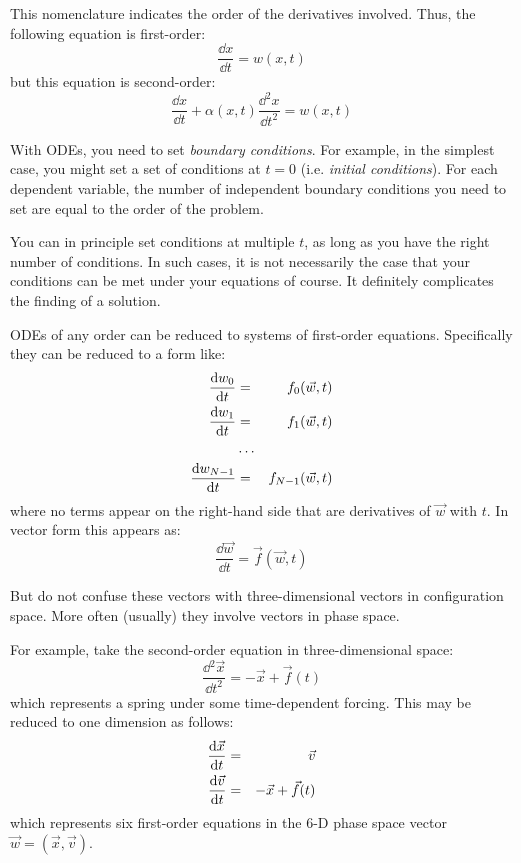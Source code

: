 
\begin{answer}
This nomenclature indicates the order of the derivatives involved.
Thus, the following equation is first-order:
\begin{equation}
\frac{\dd{x}}{\dd{t}} = w(x, t)
\end{equation}
but this equation is second-order:
\begin{equation}
  \frac{\dd{x}}{\dd{t}}
  + \alpha(x, t) \frac{\dd^2{x}}{\dd{t}^2}
  = w(x, t)
\end{equation}
\end{answer}

With ODEs, you need to set {\it boundary conditions}. For example, in
the simplest case, you might set a set of conditions at $t=0$
(i.e. {\it initial conditions}). For each dependent variable, the
number of independent boundary conditions you need to set are equal to
the order of the problem. 

You can in principle set conditions at multiple $t$, as long as you
have the right number of conditions. In such cases, it is not
necessarily the case that your conditions can be met under your
equations of course. It definitely complicates the finding of a
solution.  

ODEs of any order can be reduced to systems of first-order
equations. Specifically they can be reduced to a form like:
\begin{eqnarray}
\frac{{\rm d}w_0}{{\rm d}t} &=& f_0(\vec{w}, t) \cr
\frac{{\rm d}w_1}{{\rm d}t} &=& f_1(\vec{w}, t) \cr
&\ldots& \cr
\frac{{\rm d}w_{N-1}}{{\rm d}t} &=& f_{N-1}(\vec{w}, t)
\end{eqnarray}
where no terms appear on the right-hand side that are derivatives of
$\vec{w}$ with $t$.  In vector form this appears as:
\begin{equation}
\frac{\dd{\vec{w}}}{\dd{t}} = \vec{f}(\vec{w}, t)
\end{equation}

But do not confuse these vectors with three-dimensional vectors in
configuration space. More often (usually) they involve vectors in
phase space.

For example, take the second-order equation in three-dimensional space:
\begin{equation}
\frac{\dd{^2\vec{x}}}{\dd{t}^2} = - \vec{x} + \vec{f}(t)
\end{equation}
which represents a spring under some time-dependent forcing. This may
be reduced to one dimension as follows:
\begin{eqnarray}
\frac{{\rm d}\vec{x}}{{\rm d}t} &=& \vec{v} \cr
\frac{{\rm d}\vec{v}}{{\rm d}t} &=& - \vec{x} + \vec{f}(t)
\end{eqnarray}
which represents six first-order equations in the 6-D phase space
vector $\vec{w} = (\vec{x}, \vec{v})$.

